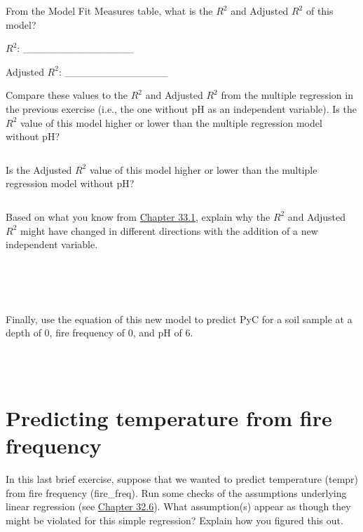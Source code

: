 \documentclass[
  openany]{krantz}
\begin{document}
From the Model Fit Measures table, what is the \(R^{2}\) and Adjusted \(R^{2}\) of this model?

\(R^{2}\): \_\_\_\_\_\_\_\_\_\_\_\_\_\_\_

Adjusted \(R^{2}\): \_\_\_\_\_\_\_\_\_\_\_\_\_\_

Compare these values to the \(R^{2}\) and Adjusted \(R^{2}\) from the multiple regression in the previous exercise (i.e., the one without pH as an independent variable).
Is the \(R^{2}\) value of this model higher or lower than the multiple regression model without pH?

\begin{verbatim}
\end{verbatim}

Is the Adjusted \(R^{2}\) value of this model higher or lower than the multiple regression model without pH?

\begin{verbatim}
\end{verbatim}

Based on what you know from \protect\hyperlink{adjusted-coefficient-of-determination}{Chapter 33.1}, explain why the \(R^{2}\) and Adjusted \(R^{2}\) might have changed in different directions with the addition of a new independent variable.

\begin{verbatim}




\end{verbatim}

Finally, use the equation of this new model to predict PyC for a soil sample at a depth of 0, fire frequency of 0, and pH of 6.

\begin{verbatim}



\end{verbatim}

\hypertarget{predicting-temperature-from-fire-frequency}{%
\section{Predicting temperature from fire frequency}\label{predicting-temperature-from-fire-frequency}}

In this last brief exercise, suppose that we wanted to predict temperature (tempr) from fire frequency (fire\_freq).
Run some checks of the assumptions underlying linear regression (see \protect\hyperlink{regression-assumptions}{Chapter 32.6}).
What assumption(s) appear as though they might be violated for this simple regression?
Explain how you figured this out.
\end{document}
